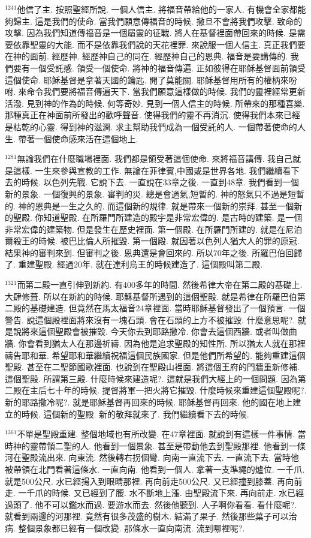 \documentclass{book}
\begin{document}
$^{1241}$他信了主.
按照聖經所說.
一個人信主.
將福音帶給他的一家人.
有機會全家都能夠歸主.
這是我們的使命.
當我們願意傳福音的時候.
撒旦不會將我們攻擊.
致命的攻擊.
因為我們知道傳福音是一個屬靈的征戰.
將人在基督裡面帶回來的時候.
是需要依靠聖靈的大能.
而不是依靠我們說的天花裡罪.
來說服一個人信主.
真正我們要在神的面前.
經歷神.
經歷神自己的同在.
經歷神自己的恩典.
福音是要講傳的.
我們要有一個受託感.
領受一個使命.
將神的福音傳遍.
正如彼得在耶穌基督面前領受這個使命.
耶穌基督是拿著天國的鑰匙.
開了莫能關.
耶穌基督用所有的權柄來吩咐.
來命令我們要將福音傳遍天下.
當我們願意這樣做的時候.
我們的靈裡經常更新活潑.
見到神的作為的時候.
何等奇妙.
見到一個人信主的時候.
所帶來的那種喜樂.
那種真正在神面前所發出的歡呼聲音.
使得我們的靈不再消沉.
使得我們本來已經是枯乾的心靈.
得到神的滋潤.
求主幫助我們成為一個受託的人.
一個帶著使命的人生.
帶著一個使命感來活在這個地上.

$^{1281}$無論我們在什麼職場裡面.
我們都是領受著這個使命.
來將福音講傳.
我自己就是這樣.
一生來參與宣教的工作.
無論在菲律賓,中國或是世界各地.
我們繼續看下去的時候.
以色列先戰.
它說下去.
一直說在33章之後.
一直到48章.
我們看到一個新的景象.
一個復興的景象.
審判的災.
總是會過氣,短暫的.
神的怒氣只不過是短暫的.
神的恩典是一生之久的.
而這個新的規律.
就是帶來一個新的崇拜.
甚至一個新的聖殿.
你知道聖殿.
在所羅門所建造的殿宇是非常宏偉的.
是古時的建築.
是一個非常宏偉的建築物.
但是發生在歷史裡面.
第一個殿.
在所羅門所建的.
就是在尼泊爾殺王的時候.
被巴比倫人所摧毀.
第一個殿.
就因著以色列人猶大人的罪的原冠.
結果神的審判來到.
但審判之後.
恩典還是會回來的.
所以70年之後.
所羅巴伯回歸了.
重建聖殿.
經過20年.
就在達利烏王的時候建造了.
這個殿叫第二殿.

$^{1321}$而第二殿一直引伸到新約.
有400多年的時間.
然後希律大帝在第二殿的基礎上.
大肆修葺.
所以在新約的時候.
耶穌基督所遇到的這個聖殿.
就是希律在所羅巴伯第二殿的基礎建造.
但竟然在馬太福音24章裡面.
當時耶穌基督發出了一個預言.
一個警告.
說這個殿裡面將來沒有一塊石頭.
會在石頭的上方不被摧毀.
什麼意思呢?.
就是說將來這個聖殿會被摧毀.
今天你去到耶路撒冷.
你會去這個西牆.
或者叫做曲牆.
你會看到猶太人在那邊祈禱.
因為他是追求聖殿的知性所.
所以猶太人就在那裡禱告耶和華.
希望耶和華繼續祝福這個民族國家.
但是他們所希望的.
能夠重建這個聖殿.
甚至在二聖節國歌裡面.
也說到在聖殿山裡面.
將這個王府的門牆重新修補.
這個聖殿.
所謂第三殿.
什麼時候來建造呢?.
這就是我們大經上的一個問題.
因為第二殿在主后七十年的時候.
提督將軍一把火將它摧毀.
什麼時候來重建這個聖殿呢?.
新的耶路撒冷呢?.
就是耶穌基督再回來的時候.
耶穌基督再回來.
他的國在地上建立的時候.
這個新的聖殿.
新的敬拜就來了.
我們繼續看下去的時候.

$^{1361}$不單是聖殿重建.
整個地域也有所改變.
在47章裡面.
就說到有這樣一件事情.
當時神的靈帶領二聖的人.
他看到一個景象.
甚至是帶動他去到聖殿那裡.
他看到一條河在聖殿流出來.
向東流.
然後轉右拐個彎.
向南一直流下去.
一直流下去.
當時他被帶領在北門看著這條水.
一直向南.
他看到一個人.
拿著一支準繩的爐位.
一千爪.
就是500公尺.
水已經揚入到眼睛那裡.
再向前走500公尺.
又已經撞到膝蓋.
再向前走.
一千爪的時候.
又已經到了腰.
水不斷地上漲.
由聖殿流下來.
再向前走.
水已經過頭了.
他不可以鑑水而過.
要游水而去.
然後他聽到.
人子啊你看看.
看什麼呢?.
就看到兩邊的河那裡.
竟然有很多茂盛的樹木.
結滿了果子.
然後那些葉子可以治病.
整個景象都已經有一個改變.
那條水一直向南流.
流到哪裡呢?.
\end{document}
